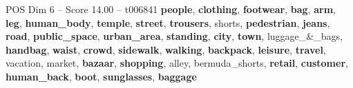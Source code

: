 \begin{textsample}{POS Dim 6 – Score 14.00 – t006841}  \label{ex:f6_pos_009}
\textbf{people}, \textbf{clothing}, \textbf{footwear}, \textbf{bag}, \textbf{arm}, \textbf{leg}, \textbf{human\_body}, \textbf{temple}, \textbf{street}, \textbf{trousers}, shorts, \textbf{pedestrian}, \textbf{jeans}, \textbf{road}, \textbf{public\_space}, \textbf{urban\_area}, \textbf{standing}, \textbf{city}, \textbf{town}, luggage\_\&\_bags, \textbf{handbag}, \textbf{waist}, \textbf{crowd}, \textbf{sidewalk}, \textbf{walking}, \textbf{backpack}, \textbf{leisure}, \textbf{travel}, vacation, market, \textbf{bazaar}, \textbf{shopping}, alley, bermuda\_shorts, \textbf{retail}, \textbf{customer}, \textbf{human\_back}, \textbf{boot}, \textbf{sunglasses}, \textbf{baggage}

\end{textsample}
